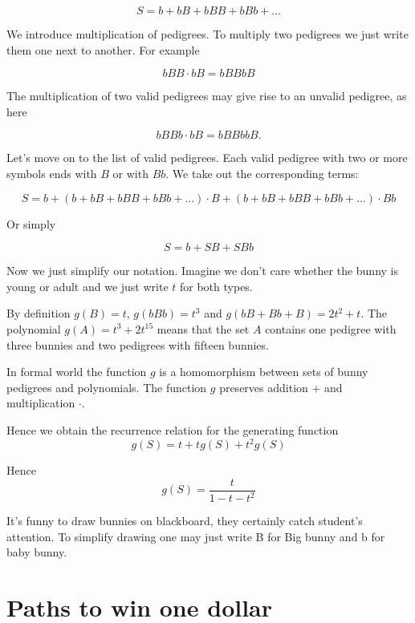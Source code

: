 \documentclass{article}
\newcommand{\bigb}{B}
\newcommand{\babyb}{b}
\begin{document}
\[
S =  \babyb + \babyb\bigb + \babyb\bigb\bigb +  \babyb\bigb\babyb + \ldots
\]

We introduce multiplication of pedigrees. 
To multiply two pedigrees we just write them one next to another. 
For example

\[
\babyb\bigb\bigb \cdot 	\babyb\bigb = \babyb\bigb\bigb\babyb\bigb
\]

The multiplication of two valid pedigrees may give rise to an unvalid pedigree,
as here

\[
   \babyb\bigb\bigb \babyb \cdot \babyb \bigb = \babyb\bigb\bigb \babyb\babyb \bigb.
\]


Let's move on to the list of valid pedigrees. 
Each valid pedigree with two or more symbols ends with $\bigb$ or with $\bigb\babyb$. 
We take out the corresponding terms:


\[
S =  \babyb + (\babyb + \babyb\bigb + \babyb\bigb\bigb +  \babyb\bigb\babyb + \ldots) \cdot \bigb + (\babyb + \babyb\bigb + \babyb\bigb\bigb +  \babyb\bigb\babyb + \ldots) \cdot \bigb\babyb
\]

Or simply 

\[
S = \babyb + S\bigb + S\bigb\babyb	
\]

Now we just simplify our notation. 
Imagine we don't care whether the bunny is young or adult and we just write $t$ for both types. 

By definition $g(\bigb) = t$, $g(\babyb\bigb\babyb) = t^3$ and $g(\babyb\bigb + \bigb\babyb +\bigb) = 2t^2 + t$.
The polynomial $g(A) = t^3 + 2t^{15}$ means that 
the set $A$ contains one pedigree with three bunnies and two pedigrees with fifteen bunnies.

In formal world the function $g$ is a homomorphism between sets of bunny pedigrees and polynomials. 
The function $g$ preserves addition $+$ and multiplication $\cdot$.

Hence we obtain the recurrence relation for the generating function
\[
g(S) = t + t g(S) + t^2 g(S)	
\]

Hence
\[
g(S) = \frac{t}{1 - t - t^2}	
\]








It's funny to draw bunnies on blackboard, they certainly catch student's attention. 
To simplify drawing one may just write B for Big bunny and b for baby bunny. 


\section{Paths to win one dollar}
\end{document}
